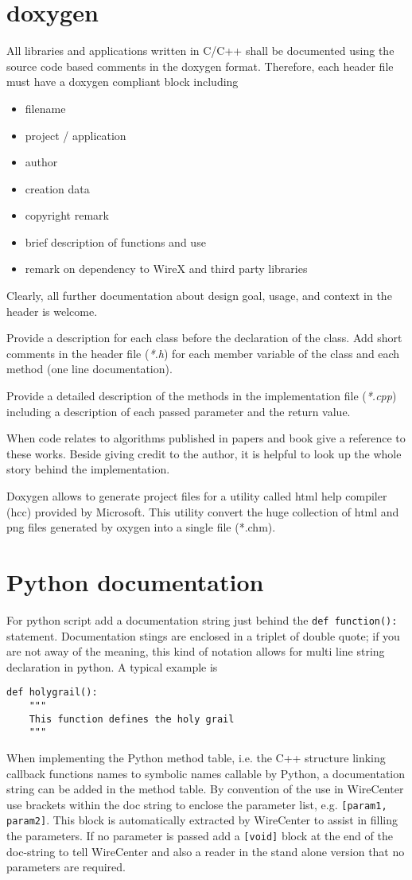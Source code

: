 \documentclass[11pt,a4paper,onepage,openany]{book}
\begin{document}
\section{doxygen}
All libraries and applications written in C/C++ shall be documented using the
source code based comments in the doxygen format. Therefore, each header file
must have a doxygen compliant block including
\begin{itemize}
  \item filename
  \item project / application
  \item author
  \item creation data
  \item copyright remark
  \item brief description of functions and use
  \item remark on dependency to WireX and third party libraries
\end{itemize}
Clearly, all further documentation about design goal, usage, and context in the
header is welcome.

Provide a description for each class before the declaration of the class. Add
short comments in the header file (\emph{*.h}) for each member variable of the
class and each method (one line documentation).

Provide a detailed description of the methods in the implementation file
(\emph{*.cpp}) including a description of each passed parameter and the return
value.

When code relates to algorithms published in papers and book give a reference
to these works. Beside giving credit to the author, it is helpful to look up
the whole story behind the implementation.

Doxygen allows to generate project files for a utility called html help
compiler (hcc) provided by Microsoft. This utility convert the huge collection
of html and png files generated by oxygen into a single file (*.chm).

\section{Python documentation}
For python script add a documentation string just behind the \texttt{def
function():} statement. Documentation stings are enclosed in a triplet of
double quote; if you are not away of the meaning, this kind of notation allows
for multi line string declaration in python. A typical example is
\begin{verbatim}
def holygrail():
    """
    This function defines the holy grail
    """
\end{verbatim}
When implementing the Python method table, i.e. the C++ structure linking
callback functions names to symbolic names callable by Python, a documentation
string can be added in the method table. By convention of the use in WireCenter
use brackets within the doc string to enclose the parameter list, e.g.
\texttt{[param1, param2]}. This block is automatically extracted by WireCenter
to assist in filling the parameters. If no parameter is passed add a
\texttt{[void]} block at the end of the doc-string to tell WireCenter and also
a reader in the stand alone version that no parameters are required.
\end{document}
